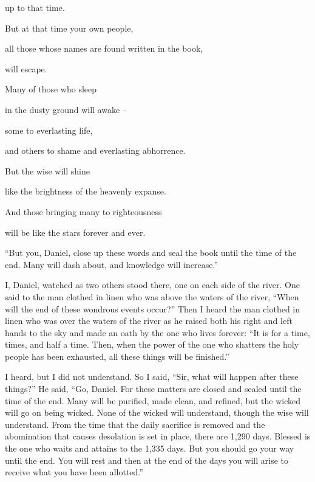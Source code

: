{\par }{\Q up
to that time.
\par }{\Q But at that time
your own people,
\par }{\Q all
those whose names are found
written
in the book,
\par }{\Q will escape.
\par }{\Q {}Many
of those who sleep
\par }{\Q in the dusty
ground
will awake
–
\par }{\Q some to everlasting
life,
\par }{\Q and others
to shame
and everlasting
abhorrence.
\par }{\Q {}But the wise
will shine
\par }{\Q like the brightness
of the heavenly expanse.
\par }{\Q And those bringing
many
to righteousness
\par }{\Q will be like the stars
forever
and ever.
\par }{\PP {}“But you,
Daniel,
close
up these words
and seal
the book
until
the time
of the end.
Many
will dash about,
and knowledge
will increase.”
\par }{\PP {}I,
Daniel,
watched
as two
others
stood
there, one
on each side of the river.
One said
to the man
clothed
in linen
who was above
the waters
of the river,
“When
will the end
of these wondrous events occur?”
Then I heard
the
man
clothed
in linen
who was over
the waters
of the river
as he raised
both his right
and left hands
to
the sky
and made an oath
by the one who lives
forever: “It is for
a time, times,
and half
a time.
Then, when
the power
of the one who shatters
the holy
people
has been exhausted,
all
these
things will be finished.”
\par }{\PP {}I
heard,
but I did not
understand.
So I said,
“Sir,
what
will happen
after these things?”
He said,
“Go,
Daniel.
For
these matters are closed
and sealed
until
the time
of the end.
Many
will be purified,
made clean, and refined,
but the wicked
will go on being wicked. None
of the wicked
will understand,
though the wise
will understand.
From the time
that the daily
sacrifice is removed
and the abomination
that causes desolation
is set
in place, there are 1,290
days.
Blessed
is the one who waits
and attains
to the 1,335
days.
But you
should go
your way until the end.
You will rest
and then at the end
of the days
you will arise
to receive what
you have been allotted.”
\par }